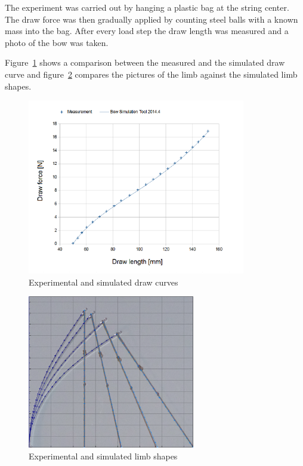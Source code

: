 The experiment was carried out by hanging a plastic bag at the string center.
The draw force was then gradually applied by counting steel balls with a known mass into the bag.
After every load step the draw length was measured and a photo of the bow was taken.

Figure~\ref{fig:validation:draw_curve} shows a comparison between the measured and the simulated draw curve and figure~\ref{fig:validation:limb_shapes} compares the pictures of the limb against the simulated limb shapes.

\begin{figure}[H]
\centering
\includegraphics[width=0.85\textwidth]{figures/validation/draw_curve.png}
\caption{Experimental and simulated draw curves}
\label{fig:validation:draw_curve}
\end{figure}

\begin{figure}[H]
\centering
\includegraphics[width=0.65\textwidth]{figures/validation/states_blended.png}
\caption{Experimental and simulated limb shapes}
\label{fig:validation:limb_shapes}
\end{figure}

